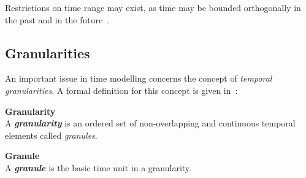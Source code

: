 Restrictions on time range may exist, as time may be bounded orthogonally in the past and in the future~\cite{Jensen94thetsql2}.



\subsection{Granularities}\label{subsec:granularity}
An important issue in time modelling concerns the concept of \emph{temporal granularities}. A formal definition for this concept is given in~\cite{Lin97}:

\begin{svgraybox}
\vspace{-10pt}
\begin{definition}\textbf{Granularity}~\cite{wang93}\\
A \emph{\textbf{granularity}} is an ordered set of non-overlapping and continuous temporal elements called \emph{granules}.
\end{definition}

\begin{definition}\textbf{Granule}~\cite{wang93}\\
A \textbf{\emph{granule}} is the basic time unit in a granularity.
\end{definition}
\vspace{-10pt}
\end{svgraybox}

